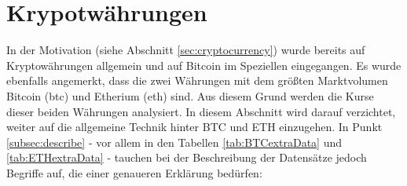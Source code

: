 \chapter{Krypotwährungen}\label{sec:cryptocurrency2}
In der Motivation (siehe Abschnitt \ref{sec:cryptocurrency}) wurde bereits auf Kryptowährungen allgemein und auf Bitcoin im Speziellen eingegangen. Es wurde ebenfalls angemerkt, dass die zwei Währungen mit dem größten Marktvolumen Bitcoin (\gls{btc}) und Etherium (\gls{eth}) sind. Aus diesem Grund werden die Kurse dieser beiden Währungen analysiert. In diesem Abschnitt wird darauf verzichtet, weiter auf die allgemeine Technik hinter BTC und ETH einzugehen. In Punkt \ref{subsec:describe} - vor allem in den Tabellen \ref{tab:BTCextraData} und \ref{tab:ETHextraData} - tauchen bei der Beschreibung der Datensätze jedoch Begriffe auf, die einer genaueren Erklärung bedürfen:
